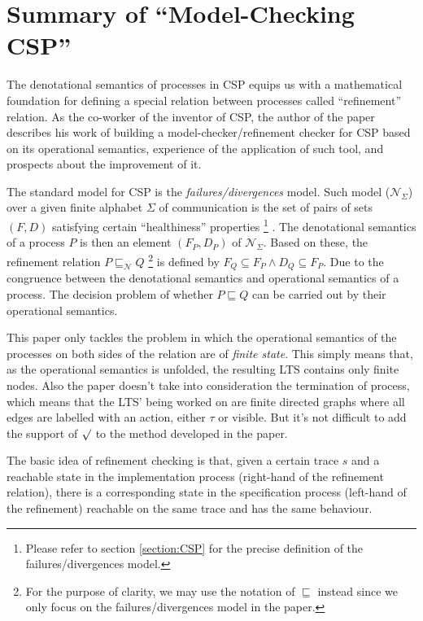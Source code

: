 \documentclass{llncs}
\newcommand{\csptick}{\surd}
\newcommand{\cspfdrmodel}{\mathcal{N}}
\begin{document}
\newpage
\section{Summary of ``Model-Checking CSP''\cite{Roscoe1994Modelchecking}}
  \label{section:modelcheckingcsp}
The denotational semantics of processes in CSP equips us with a mathematical
foundation for defining a special relation between processes called
``refinement'' relation. As the co-worker of the inventor of CSP, the author of
the paper describes his work of building a model-checker/refinement checker for
CSP based on its operational semantics, experience of the application of such tool,
 and prospects about the improvement of it.

The standard model for CSP is the \emph{failures/divergences} model. Such model
($\cspfdrmodel_{\Sigma}$) over a given finite alphabet $\Sigma$ of communication
is the set of pairs of sets $(F, D)$ satisfying certain ``healthiness'' properties
\footnote{Please refer to section \ref{section:CSP} for the precise definition of the
failures/divergences model.}
. The denotational semantics of a process $P$ is then an element $(F_P, D_P)$ of
$\cspfdrmodel_{\Sigma}$. 
Based on these, the refinement relation $P \sqsubseteq_{\cspfdrmodel} Q$
\footnote{For the purpose of clarity, we may use the notation of $\sqsubseteq$
instead since we only focus on the failures/divergences model in the paper.}
is defined by $F_Q \subseteq F_P \land D_Q \subseteq F_P$.
Due to the congruence between the denotational semantics and operational
semantics of a process. The decision problem of whether 
$P \sqsubseteq Q$ can be carried out by their operational semantics.

This paper only tackles the problem in which the operational semantics of the
processes on both sides of the relation are of \emph{finite state}. This simply
means that, as the operational semantics is unfolded, the resulting LTS contains
only finite nodes. Also the paper doesn't take into consideration the
termination of process, which means that the LTS' being worked on are finite
directed graphs where all edges are labelled with an action, either $\tau$ or
visible. But it's not difficult to add the support of $\csptick$ to the method
developed in the paper.

The basic idea of refinement checking is that, given a certain trace $s$ and a
reachable state in the implementation process (right-hand of the refinement
relation), there is a corresponding state in the specification process
(left-hand of the refinement) reachable on the same trace and has the same
behaviour.
\end{document}
